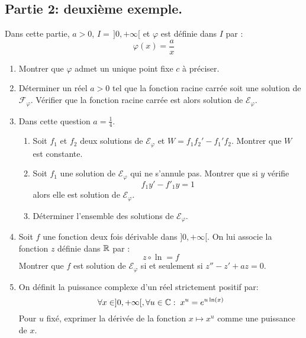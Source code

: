 \subsection*{Partie 2: deuxième exemple.}
Dans cette partie, $a>0$, $I=\,]0,+\infty[$ et $\varphi$ est définie dans $I$ par :
\begin{displaymath}
  \varphi(x) = \frac{a}{x}
\end{displaymath}
\begin{enumerate}
  \item Montrer que $\varphi$ admet un unique point fixe $c$ à préciser.

  \item Déterminer un réel $a>0$ tel que la fonction racine carrée soit une solution de $\mathcal{F}_\varphi$. Vérifier que la fonction racine carrée est alors solution de $\mathcal{E}_\varphi$.
  \item Dans cette question $a=\frac{1}{4}$.
  \begin{enumerate}
    \item Soit $f_1$ et $f_2$ deux solutions de $\mathcal{E}_\varphi$ et $W=f_1f_2' - f_1'f_2$.\newline
    Montrer que $W$ est constante.
    \item Soit $f_1$ une solution de $\mathcal{E}_\varphi$ qui ne s'annule pas. Montrer que si $y$ vérifie
    \begin{displaymath}
      f_1 y' - f'_1 y = 1
    \end{displaymath}
alors elle est solution de $\mathcal{E}_\varphi$.
\item Déterminer l'ensemble des solutions de $\mathcal{E}_\varphi$.
  \end{enumerate}

\item Soit $f$ une fonction deux fois dérivable dans $]0, +\infty[$. On lui associe la fonction $z$ définie dans $\mathbb{R}$ par :
\begin{displaymath}
  z\circ \ln  = f
\end{displaymath}
Montrer que $f$ est solution de $\mathcal{E}_\varphi$ si et seulement si $z'' -z' +az=0$.

\item On définit la puissance complexe d'un réel strictement positif par:
\begin{displaymath}
\forall x\in ]0,+\infty[, \forall u\in \mathbb{C}:\;  x^u = e^{u\ln(x)}
\end{displaymath}
Pour $u$ fixé, exprimer la dérivée de la fonction $x\mapsto x^u$ comme une puissance de $x$.


\end{enumerate}
